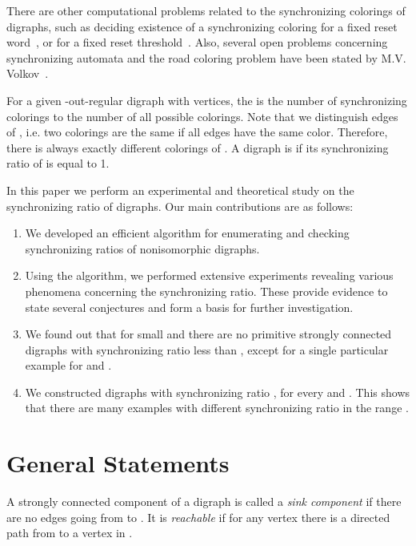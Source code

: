 \documentclass[runningheads]{llncs}
\begin{document}
There are other computational problems related to the synchronizing colorings of digraphs, such as deciding existence of a synchronizing coloring for a fixed reset word~\cite{VorelRoman2015ComplexityOfRoadColoringWithPrescribedResetWords}, or for a fixed reset threshold~\cite{Roman2012P-NPThresholdForSynchronizingRoadColoring}.
Also, several open problems concerning synchronizing automata and the road coloring problem have been stated by M.V. Volkov~\cite{Volkov2008OpenProblemsOnSynchronizingAutomata}.





For a given -out-regular digraph  with  vertices,
the  is the number of synchronizing colorings to the number  of all possible colorings.
Note that we distinguish edges of , i.e. two colorings are the same if all edges have the same color. Therefore, there is always exactly  different colorings of .
A digraph  is  if its synchronizing ratio of  is equal to 1.

In this paper we perform an experimental and theoretical study on the synchronizing ratio of digraphs. Our main contributions are as follows:
\begin{enumerate}
\item We developed an efficient algorithm for enumerating and checking synchronizing ratios of nonisomorphic digraphs.
\item Using the algorithm, we performed extensive experiments revealing various phenomena concerning the synchronizing ratio.
These provide evidence to state several conjectures and form a basis for further investigation.
\item We found out that for small  and  there are no primitive strongly connected digraphs with synchronizing ratio less than , except for a single particular example for  and .
\item We constructed digraphs with synchronizing ratio , for every  and . This shows that there are many examples with different synchronizing ratio in the range .
\end{enumerate}


\section{General Statements}

A strongly connected component  of a digraph  is called a \emph{sink component} if there are no edges going from  to .
It is \emph{reachable} if for any vertex  there is a directed path from  to a vertex in .
\end{document}
